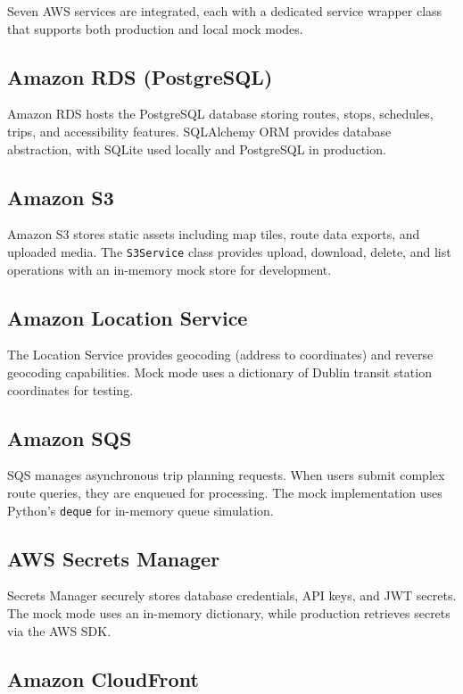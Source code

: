 \documentclass[conference]{IEEEtran}
\begin{document}
Seven AWS services are integrated, each with a dedicated service wrapper class that supports both production and local mock modes.

\subsection{Amazon RDS (PostgreSQL)}

Amazon RDS hosts the PostgreSQL database storing routes, stops, schedules, trips, and accessibility features. SQLAlchemy ORM provides database abstraction, with SQLite used locally and PostgreSQL in production.

\subsection{Amazon S3}

Amazon S3 stores static assets including map tiles, route data exports, and uploaded media. The \texttt{S3Service} class provides upload, download, delete, and list operations with an in-memory mock store for development.

\subsection{Amazon Location Service}

The Location Service provides geocoding (address to coordinates) and reverse geocoding capabilities. Mock mode uses a dictionary of Dublin transit station coordinates for testing.

\subsection{Amazon SQS}

SQS manages asynchronous trip planning requests. When users submit complex route queries, they are enqueued for processing. The mock implementation uses Python's \texttt{deque} for in-memory queue simulation.

\subsection{AWS Secrets Manager}

Secrets Manager securely stores database credentials, API keys, and JWT secrets. The mock mode uses an in-memory dictionary, while production retrieves secrets via the AWS SDK.

\subsection{Amazon CloudFront}
\end{document}
